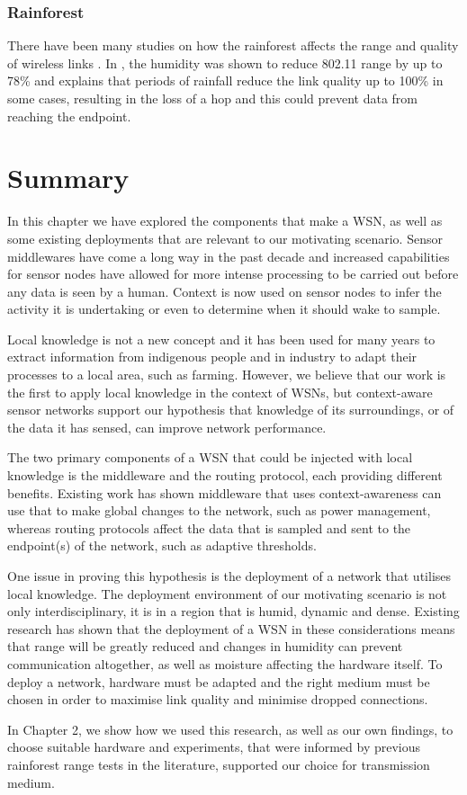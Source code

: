 	\subsubsection{Rainforest}
	There have been many studies on how the rainforest affects the range and quality of wireless links \cite{Figueiredo2009, Wark2008, Rahman2008}. In \cite{Figueiredo2009}, the humidity was shown to reduce 802.11 range by up to 78\% and \cite{Wark2008} explains that periods of rainfall reduce the link quality up to 100\% in some cases, resulting in the loss of a hop and this could prevent data from reaching the endpoint.

\section{Summary}
	In this chapter we have explored the components that make a WSN, as well as some existing deployments that are relevant to our motivating scenario. Sensor middlewares have come a long way in the past decade and increased capabilities for sensor nodes have allowed for more intense processing to be carried out before any data is seen by a human. Context is now used on sensor nodes to infer the activity it is undertaking or even to determine when it should wake to sample. 

Local knowledge is not a new concept and it has been used for many years to extract information from indigenous people and in industry to adapt their processes to a local area, such as farming. However, we believe that our work is the first to apply local knowledge in the context of WSNs, but context-aware sensor networks support our hypothesis that knowledge of its surroundings, or of the data it has sensed, can improve network performance.

The two primary components of a WSN that could be injected with local knowledge is the middleware and the routing protocol, each providing different benefits. Existing work has shown middleware that uses context-awareness can use that to make global changes to the network, such as power management, whereas routing protocols affect the data that is sampled and sent to the endpoint(s) of the network, such as adaptive thresholds.

One issue in proving this hypothesis is the deployment of a network that utilises local knowledge. The deployment environment of our motivating scenario is not only interdisciplinary, it is in a region that is humid, dynamic and dense. Existing research has shown that the deployment of a WSN in these considerations means that range will be greatly reduced and changes in humidity can prevent communication altogether, as well as moisture affecting the hardware itself.
To deploy a network, hardware must be adapted and the right medium must be chosen in order to maximise link quality and minimise dropped connections.

In Chapter 2, we show how we used this research, as well as our own findings, to choose suitable hardware and experiments, that were informed by previous rainforest range tests in the literature, supported our choice for transmission medium.

